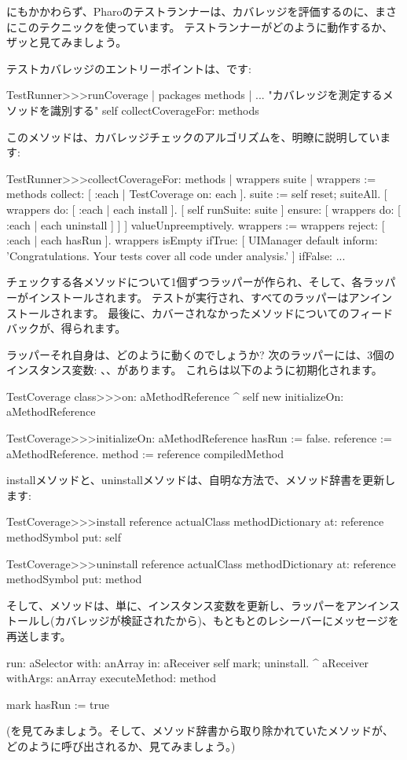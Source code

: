 \documentclass[a4paper,10pt,twoside]{book}
\begin{document}
にもかかわらず、Pharoのテストランナーは、カバレッジを評価するのに、まさにこのテクニックを使っています。
テストランナーがどのように動作するか、ザッと見てみましょう。

テストカバレッジのエントリーポイントは、です:
\begin{code}{}
TestRunner>>>runCoverage
	| packages methods |
	... "カバレッジを測定するメソッドを識別する"
	self collectCoverageFor: methods
\end{code}

このメソッドは、カバレッジチェックのアルゴリズムを、明瞭に説明しています:
\begin{code}{}
TestRunner>>>collectCoverageFor: methods
	| wrappers suite |
	wrappers := methods collect: [ :each | TestCoverage on: each ].
	suite := self
		reset;
		suiteAll.
	[ wrappers do: [ :each | each install ].
	  [ self runSuite: suite ] ensure: [ wrappers do: [ :each | each uninstall ] ] ] valueUnpreemptively.
	wrappers := wrappers reject: [ :each | each hasRun ].
	wrappers isEmpty 
		ifTrue: 
			[ UIManager default inform: 'Congratulations. Your tests cover all code under analysis.' ]
		ifFalse: ...
\end{code}
チェックする各メソッドについて1個ずつラッパーが作られ、そして、各ラッパーがインストールされます。
テストが実行され、すべてのラッパーはアンインストールされます。
最後に、カバーされなかったメソッドについてのフィードバックが、得られます。

ラッパーそれ自身は、どのように動くのでしょうか?
次のラッパーには、3個のインスタンス変数: 、、があります。
これらは以下のように初期化されます。
\begin{code}{}
TestCoverage class>>>on: aMethodReference
	^ self new initializeOn: aMethodReference

TestCoverage>>>initializeOn: aMethodReference
	hasRun := false.
	reference := aMethodReference.
	method := reference compiledMethod
\end{code}

installメソッドと、uninstallメソッドは、自明な方法で、メソッド辞書を更新します:
\begin{code}{}
TestCoverage>>>install
	reference actualClass methodDictionary
		at: reference methodSymbol
		put: self

TestCoverage>>>uninstall
	reference actualClass methodDictionary
		at: reference methodSymbol
		put: method
\end{code}
\noindent
そして、メソッドは、単に、インスタンス変数を更新し、ラッパーをアンインストールし(カバレッジが検証されたから)、もともとのレシーバーにメッセージを再送します。 %
\begin{code}{}
run: aSelector with: anArray in: aReceiver
	self mark; uninstall.
	^ aReceiver withArgs: anArray executeMethod: method

mark
	hasRun := true
\end{code}
(を見てみましょう。そして、メソッド辞書から取り除かれていたメソッドが、どのように呼び出されるか、見てみましょう。)
\end{document}
